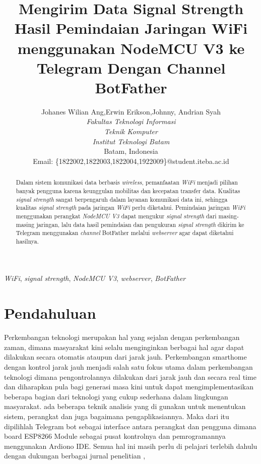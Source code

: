 \documentclass[conference]{IEEEtran}
\title{Mengirim Data Signal Strength Hasil Pemindaian Jaringan WiFi menggunakan NodeMCU V3 ke Telegram Dengan Channel BotFather}
\author{Johanes Wilian Ang\IEEEauthorrefmark{1},Erwin Erikson\IEEEauthorrefmark{2},Johnny\IEEEauthorrefmark{3}, Andrian Syah\IEEEauthorrefmark{4}\\
\textit{Fakultas Teknologi Informasi}\\
\textit{Teknik Komputer}\\
\textit{Institut Teknologi Batam}\\
Batam, Indonesia\\
Email: \{\IEEEauthorrefmark{1}1822002,\IEEEauthorrefmark{2}1822003,\IEEEauthorrefmark{3}1822004,\IEEEauthorrefmark{4}1922009\}@student.iteba.ac.id}
\begin{document}
\maketitle

\begin{abstract}
    Dalam sistem komunikasi data berbasis \emph{wireless}, pemanfaatan \emph{WiFi} 
    menjadi pilihan banyak pengguna karena keunggulan mobilitas dan kecepatan transfer data.
    Kualitas \emph{signal strength} sangat berpengaruh dalam layanan komunikasi data ini, 
    sehingga kualitas \emph{signal strength} pada jaringan \emph{WiFi} perlu diketahui.
    Pemindaian jaringan \emph{WiFi} menggunakan perangkat \emph{NodeMCU V3} dapat mengukur \emph{signal strength} dari 
    masing-masing jaringan, lalu data hasil pemindaian dan pengukuran \emph{signal strength} dikirim ke
    Telegram menggunakan \emph{channel} BotFather melalui \emph{webserver} agar dapat diketahui hasilnya.
\end{abstract}

\begin{IEEEkeywords}
    \emph{WiFi}, \emph{signal strength}, \emph{NodeMCU V3}, \emph{webserver}, \emph{BotFather}
\end{IEEEkeywords}

\section{Pendahuluan}
Perkembangan teknologi merupakan hal yang sejalan dengan 
perkembangan zaman, dimana masyarakat kini selalu
menginginkan berbagai hal agar dapat dilakukan secara otomatis
ataupun dari jarak jauh. Perkembangan smarthome dengan
kontrol jarak jauh menjadi salah satu fokus utama dalam
perkembangan teknologi dimana pengontrolannya dilakukan dari
jarak jauh dan secara real time dan diharapkan pula bagi generasi
masa kini untuk dapat mengimplementasikan beberapa bagian
dari teknologi yang cukup sederhana dalam lingkungan masyarakat. ada
beberapa teknik analisis yang di gunakan untuk menentukan
sistem, perangkat dan juga bagaimana pengaplikasiannya. Maka
dari itu dipilihlah Telegram bot sebagai interface antara perangkat
dan pengguna dimana board ESP8266 Module sebagai pusat
kontrolnya dan pemrogramannya menggunakan Ardiono IDE.
Semua hal ini masih perlu di pelajari terlebih dahulu dengan
dukungan berbagai jurnal penelitian ,
    
\end{document}
